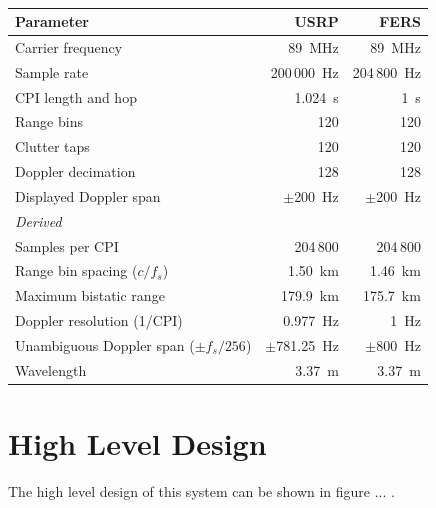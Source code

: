 \begin{table}[H]
    \centering
    \caption[TODO]{}
    \label{tab:ch3.parameters}
    \begin{tabular}{lrr}
    \toprule
    \textbf{Parameter} & \textbf{USRP} & \textbf{FERS} \\
    \midrule
    Carrier frequency          & 89~MHz            & 89~MHz \\
    Sample rate                & 200\,000~Hz       & 204\,800~Hz \\
    CPI length and hop         & 1.024~s           & 1~s \\
    Range bins                 & 120               & 120 \\
    Clutter taps               & 120               & 120 \\
    Doppler decimation         & 128               & 128 \\
    Displayed Doppler span     & $\pm$200~Hz       & $\pm$200~Hz \\
    \midrule
    \multicolumn{3}{l}{\textit{Derived}} \\
    Samples per CPI                              & 204\,800          & 204\,800 \\
    Range bin spacing ($c/f_s$)                  & 1.50~km           & 1.46~km \\
    Maximum bistatic range                       & 179.9~km          & 175.7~km \\
    Doppler resolution (1/CPI)                   & 0.977~Hz          & 1~Hz \\
    Unambiguous Doppler span ($\pm f_s/256$)     & $\pm$781.25~Hz    & $\pm$800~Hz \\
    Wavelength                                   & 3.37~m            & 3.37~m \\
    \bottomrule
    \end{tabular}
\end{table}

\section{High Level Design}
\label{sec:ch3.highlevel}
\label{sec:ch3.architecture}

The high level design of this system can be shown in figure ... . 

